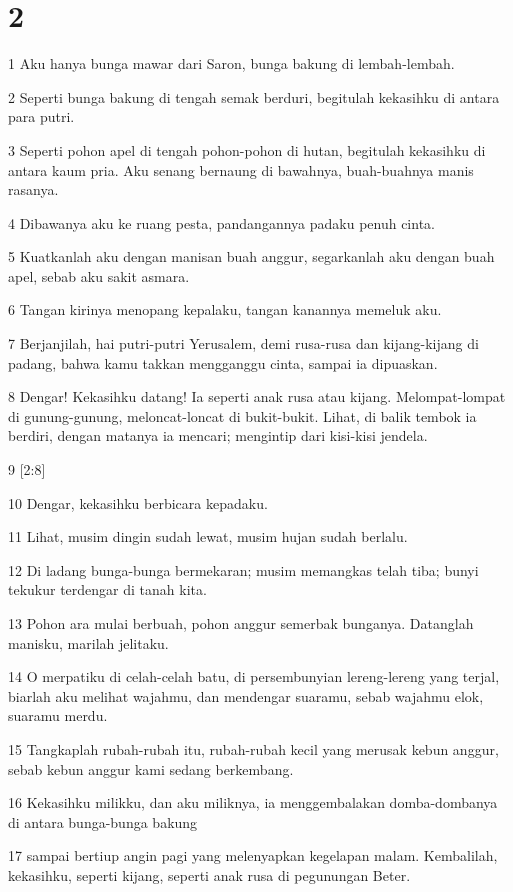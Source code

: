 \chapter{2}

\par 1 Aku hanya bunga mawar dari Saron, bunga bakung di lembah-lembah.
\par 2 Seperti bunga bakung di tengah semak berduri, begitulah kekasihku di antara para putri.
\par 3 Seperti pohon apel di tengah pohon-pohon di hutan, begitulah kekasihku di antara kaum pria. Aku senang bernaung di bawahnya, buah-buahnya manis rasanya.
\par 4 Dibawanya aku ke ruang pesta, pandangannya padaku penuh cinta.
\par 5 Kuatkanlah aku dengan manisan buah anggur, segarkanlah aku dengan buah apel, sebab aku sakit asmara.
\par 6 Tangan kirinya menopang kepalaku, tangan kanannya memeluk aku.
\par 7 Berjanjilah, hai putri-putri Yerusalem, demi rusa-rusa dan kijang-kijang di padang, bahwa kamu takkan mengganggu cinta, sampai ia dipuaskan.
\par 8 Dengar! Kekasihku datang! Ia seperti anak rusa atau kijang. Melompat-lompat di gunung-gunung, meloncat-loncat di bukit-bukit. Lihat, di balik tembok ia berdiri, dengan matanya ia mencari; mengintip dari kisi-kisi jendela.
\par 9 [2:8]
\par 10 Dengar, kekasihku berbicara kepadaku.
\par 11 Lihat, musim dingin sudah lewat, musim hujan sudah berlalu.
\par 12 Di ladang bunga-bunga bermekaran; musim memangkas telah tiba; bunyi tekukur terdengar di tanah kita.
\par 13 Pohon ara mulai berbuah, pohon anggur semerbak bunganya. Datanglah manisku, marilah jelitaku.
\par 14 O merpatiku di celah-celah batu, di persembunyian lereng-lereng yang terjal, biarlah aku melihat wajahmu, dan mendengar suaramu, sebab wajahmu elok, suaramu merdu.
\par 15 Tangkaplah rubah-rubah itu, rubah-rubah kecil yang merusak kebun anggur, sebab kebun anggur kami sedang berkembang.
\par 16 Kekasihku milikku, dan aku miliknya, ia menggembalakan domba-dombanya di antara bunga-bunga bakung
\par 17 sampai bertiup angin pagi yang melenyapkan kegelapan malam. Kembalilah, kekasihku, seperti kijang, seperti anak rusa di pegunungan Beter.

